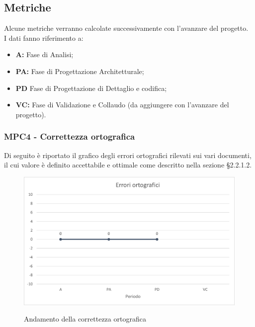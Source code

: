 \subsection{Metriche}
Alcune metriche verranno calcolate successivamente con l'avanzare del progetto.\\

I dati fanno riferimento a:
\begin{itemize}
	\item \textbf{A:} Fase di Analisi;
	\item \textbf{PA:} Fase di Progettazione Architetturale;
	\item \textbf{PD} Fase di Progettazione di Dettaglio e codifica;
	\item \textbf{VC: } Fase di Validazione e Collaudo (da aggiungere con l'avanzare del progetto).
\end{itemize}



\subsubsection{MPC4 - Correttezza ortografica}
Di seguito è riportato il grafico degli errori ortografici rilevati sui vari documenti, il cui valore è definito accettabile e ottimale come descritto nella sezione §2.2.1.2.\\

\begin{figure}[H]
\centering
\includegraphics[scale=0.78]{res/ResocontoAttivitaDiVerifica/res/metriche/grafici/img/correttezzaOrtografica.png}\\
\caption{Andamento della correttezza ortografica}
\end{figure}

